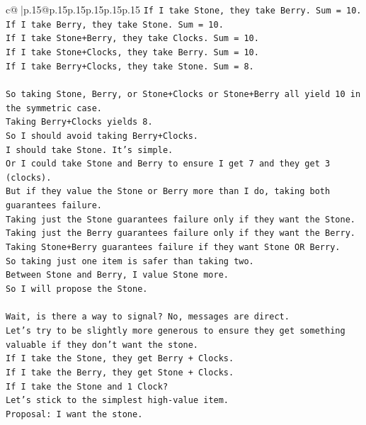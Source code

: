 \documentclass{article}
\begin{document}
{\begin{supertabular}{c@{$\;$}|p{.15\linewidth}@{}p{.15\linewidth}p{.15\linewidth}p{.15\linewidth}p{.15\linewidth}p{.15\linewidth}}
{{{\texttt{If I take Stone, they take Berry. Sum = 10.} \\
\texttt{If I take Berry, they take Stone. Sum = 10.} \\
\texttt{If I take Stone+Berry, they take Clocks. Sum = 10.} \\
\texttt{If I take Stone+Clocks, they take Berry. Sum = 10.} \\
\texttt{If I take Berry+Clocks, they take Stone. Sum = 8.} \\
\\ 
\texttt{So taking Stone, Berry, or Stone+Clocks or Stone+Berry all yield 10 in the symmetric case.} \\
\texttt{Taking Berry+Clocks yields 8.} \\
\texttt{So I should avoid taking Berry+Clocks.} \\
\texttt{I should take Stone. It's simple.} \\
\texttt{Or I could take Stone and Berry to ensure I get 7 and they get 3 (clocks).} \\
\texttt{But if they value the Stone or Berry more than I do, taking both guarantees failure.} \\
\texttt{Taking just the Stone guarantees failure only if they want the Stone.} \\
\texttt{Taking just the Berry guarantees failure only if they want the Berry.} \\
\texttt{Taking Stone+Berry guarantees failure if they want Stone OR Berry.} \\
\texttt{So taking just one item is safer than taking two.} \\
\texttt{Between Stone and Berry, I value Stone more.} \\
\texttt{So I will propose the Stone.} \\
\\ 
\texttt{Wait, is there a way to signal? No, messages are direct.} \\
\texttt{Let's try to be slightly more generous to ensure they get something valuable if they don't want the stone.} \\
\texttt{If I take the Stone, they get Berry + Clocks.} \\
\texttt{If I take the Berry, they get Stone + Clocks.} \\
\texttt{If I take the Stone and 1 Clock?} \\
\texttt{Let's stick to the simplest high{-}value item.} \\
\texttt{Proposal: I want the stone.} \\
}}}
\end{supertabular}}
\end{document}
